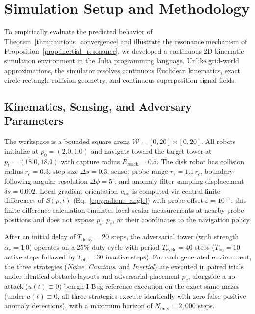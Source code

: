 \documentclass[12pt, a4paper]{article}
\begin{document}
\section{Simulation Setup and Methodology}
\label{sec:simulation}
To empirically evaluate the predicted behavior of Theorem~\ref{thm:cautious_convergence} and illustrate the resonance mechanism of Proposition~\ref{prop:inertial_resonance}, we developed a continuous 2D kinematic simulation environment in the Julia programming language. Unlike grid-world approximations, the simulator resolves continuous Euclidean kinematics, exact circle-rectangle collision geometry, and continuous superposition signal fields.

\subsection{Kinematics, Sensing, and Adversary Parameters}
The workspace is a bounded square arena $\mathcal{W} = [0, 20] \times [0, 20]$. All robots initialize at $p_0 = (2.0, 1.0)$ and navigate toward the target tower at $p_t = (18.0, 18.0)$ with capture radius $R_{\text{reach}} = 0.5$. The disk robot has collision radius $r_c = 0.3$, step size $\Delta s = 0.3$, sensor probe range $r_s = 1.1\,r_c$, boundary-following angular resolution $\Delta\phi = 5^\circ$, and anomaly filter sampling displacement $\delta s = 0.002$. Local gradient orientation $u_{\text{ori}}$ is computed via central finite differences of $S(p, t)$ (Eq.~\eqref{eq:gradient_angle}) with probe offset $\varepsilon = 10^{-5}$; this finite-difference calculation emulates local scalar measurements at nearby probe positions and does not expose $p_t$, $p_e$, or their coordinates to the navigation policy.

After an initial delay of $T_{\text{delay}} = 20$ steps, the adversarial tower (with strength $\alpha_e = 1.0$) operates on a $25\%$ duty cycle with period $T_{\text{cycle}} = 40$ steps ($T_{\text{on}} = 10$ active steps followed by $T_{\text{off}} = 30$ inactive steps). For each generated environment, the three strategies (\textit{Naive}, \textit{Cautious}, and \textit{Inertial}) are executed in paired trials under identical obstacle layouts and adversarial placement $p_e$, alongside a no-attack ($u(t) \equiv 0$) benign I-Bug reference execution on the exact same mazes (under $u(t) \equiv 0$, all three strategies execute identically with zero false-positive anomaly detections), with a maximum horizon of $N_{\max} = 2,000$ steps.
\end{document}

